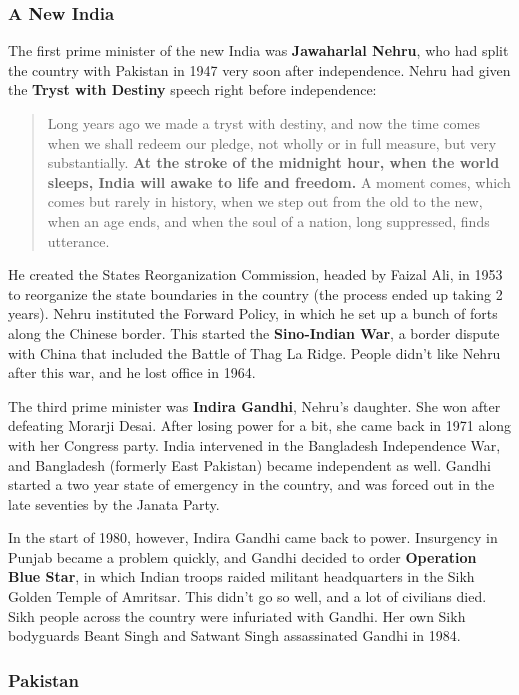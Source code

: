 \subsubsection*{A New India}

The first prime minister of the new India was \textbf{Jawaharlal Nehru},
who had split the country with Pakistan in 1947 very soon after independence.
Nehru had given the \textbf{Tryst with Destiny} speech right before independence:
\begin{quote}
  Long years ago we made a tryst with destiny, and now the time comes when we shall redeem our pledge,
  not wholly or in full measure, but very substantially.
  \textbf{At the stroke of the midnight hour, when the world sleeps, India will awake to life and freedom.}
  A moment comes, which comes but rarely in history, when we step out from the old to the new,
  when an age ends, and when the soul of a nation, long suppressed, finds utterance.
\end{quote}
He created the States Reorganization Commission, headed by Faizal Ali,
in 1953 to reorganize the state boundaries in the country (the process ended up taking 2 years).
Nehru instituted the Forward Policy, in which he set up a bunch of forts along the Chinese border.
This started the \textbf{Sino-Indian War}, a border dispute with China that included the Battle of Thag La Ridge.
People didn't like Nehru after this war, and he lost office in 1964.

The third prime minister was \textbf{Indira Gandhi}, Nehru's daughter.
She won after defeating Morarji Desai.
After losing power for a bit, she came back in 1971 along with her Congress party.
India intervened in the Bangladesh Independence War,
and Bangladesh (formerly East Pakistan) became independent as well.
Gandhi started a two year state of emergency in the country,
and was forced out in the late seventies by the Janata Party.

In the start of 1980, however, Indira Gandhi came back to power.
Insurgency in Punjab became a problem quickly, and Gandhi decided to order \textbf{Operation Blue Star},
in which Indian troops raided militant headquarters in the Sikh Golden Temple of Amritsar.
This didn't go so well, and a lot of civilians died.
Sikh people across the country were infuriated with Gandhi.
Her own Sikh bodyguards Beant Singh and Satwant Singh assassinated Gandhi in 1984.

\subsubsection*{Pakistan}

